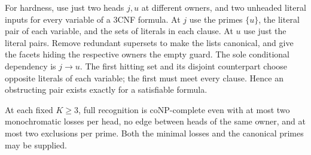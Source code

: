 For hardness, use just two heads $j,u$ at different owners, and
two unheaded literal inputs for every variable of a 3CNF formula.
At $j$ use the primes $\{u\}$, the literal pair of each variable,
and the sets of literals in each clause. At $u$ use just the
literal pairs. Remove redundant supersets to make the lists
canonical, and give the facets hiding the respective owners the
empty guard. The sole conditional dependency is $j\to u$. The
first hitting set and its disjoint counterpart choose opposite
literals of each variable; the first must meet every clause.
Hence an obstructing pair exists exactly for a satisfiable formula.

\begin{theorem}
\label{core:thm:two-monochromatic-losses}
At each fixed $K\ge3$, full recognition is coNP-complete even with at
most two monochromatic losses per head, no edge between heads of the
same owner, and at most two exclusions per prime. Both the minimal
losses and the canonical primes may be supplied.
\end{theorem}
